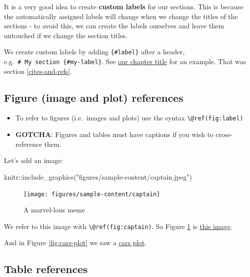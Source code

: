 \documentclass[a4paper, nobind]{templates/ociamthesis}
\providecommand{\tightlist}{%
  \setlength{\itemsep}{0pt}\setlength{\parskip}{0pt}}
\newenvironment{Shaded}{\begin{snugshade}}{\end{snugshade}}
\newcommand{\FunctionTok}[1]{\textcolor[rgb]{0.00,0.00,0.00}{#1}}
\newcommand{\NormalTok}[1]{#1}
\newcommand{\SpecialCharTok}[1]{\textcolor[rgb]{0.00,0.00,0.00}{#1}}
\newcommand{\StringTok}[1]{\textcolor[rgb]{0.31,0.60,0.02}{#1}}
\renewenvironment{Shaded}
{
  \vspace{10pt}%
  \begin{snugshade}%
}{%
  \end{snugshade}%
  \vspace{8pt}%
}
\begin{document}
It is a very good idea to create \textbf{custom labels} for our sections. This is because the automatically assigned labels will change when we change the titles of the sections - to avoid this, we can create the labels ourselves and leave them untouched if we change the section titles.

We create custom labels by adding \texttt{\{\#label\}} after a header, e.g.~\texttt{\#\ My\ section\ \{\#my-label\}}.
See \protect\hyperlink{cites-and-refs}{our chapter title} for an example. That was section \ref{cites-and-refs}.

\hypertarget{figure-image-and-plot-references}{%
\subsection{Figure (image and plot) references}\label{figure-image-and-plot-references}}

\begin{itemize}
\tightlist
\item
  To refer to figures (i.e.~images and plots) use the syntax \texttt{\textbackslash{}@ref(fig:label)}
\item
  \textbf{GOTCHA}: Figures and tables must have captions if you wish to cross-reference them.
\end{itemize}

Let's add an image:

\begin{Shaded}
\begin{Highlighting}[]
\NormalTok{knitr}\SpecialCharTok{::}\FunctionTok{include\_graphics}\NormalTok{(}\StringTok{"figures/sample{-}content/captain.jpeg"}\NormalTok{)}
\end{Highlighting}
\end{Shaded}

\begin{figure}

{\centering \texttt{[image: figures/sample-content/captain]} 

}

\caption{A marvel-lous meme}\label{fig:captain}
\end{figure}

We refer to this image with \texttt{\textbackslash{}@ref(fig:captain)}.
So Figure \ref{fig:captain} is \protect\hyperlink{fig:captain}{this image}.

And in Figure \ref{fig:cars-plot} we saw a \protect\hyperlink{fig:cars-plot}{cars plot}.

\hypertarget{table-references}{%
\subsection{Table references}\label{table-references}}
\end{document}
